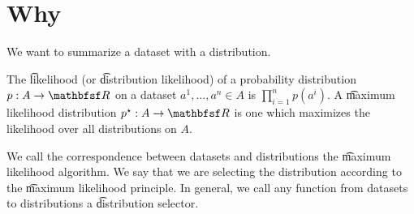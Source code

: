 
\section*{Why}

We want to summarize a dataset with a distribution.


The \t{likelihood} (or \t{distribution likelihood}) of a probability distribution $p: A \to \R $ on a dataset $a^1, \dots , a^n \in A$ is $\prod_{i = 1}^{n} p(a^i)$.
A \t{maximum likelihood distribution} $p^\star: A \to \R $ is one which maximizes the likelihood over all distributions on $A$.

We call the correspondence between datasets and distributions the \t{maximum likelihood algorithm}.
We say that we are selecting the distribution according to the \t{maximum likelihood principle}.
In general, we call any function from datasets to distributions a \t{distribution selector}.

\blankpage
